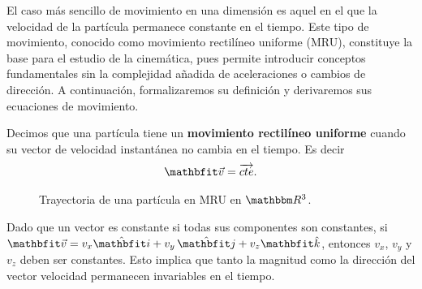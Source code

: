 El caso más sencillo de movimiento en una dimensión es aquel en el que la velocidad de la partícula permanece constante en el tiempo. Este tipo de movimiento, conocido como movimiento rectilíneo uniforme (MRU), constituye la base para el estudio de la cinemática, pues permite introducir conceptos fundamentales sin la complejidad añadida de aceleraciones o cambios de dirección. A continuación, formalizaremos su definición y derivaremos sus ecuaciones de movimiento.

\begin{definition}{}{}
    Decimos que una partícula tiene un \textbf{movimiento rectilíneo uniforme} cuando su vector de velocidad instantánea no cambia en el tiempo. Es decir
    $$\veloi = \cte.$$
\end{definition}
\begin{figure}
    \centering
    \caption{Trayectoria de una partícula en MRU en $\RR[3]$.}
    \label{fig:MRU_3D}
\end{figure}

Dado que un vector es constante si todas sus componentes son constantes, si $\veloi = v_x\veci+ v_y\,\vecj+ v_z\veck$, entonces $v_x$, $v_y$ y $v_z$ deben ser constantes. Esto implica que tanto la magnitud como la dirección del vector velocidad permanecen invariables en el tiempo.

